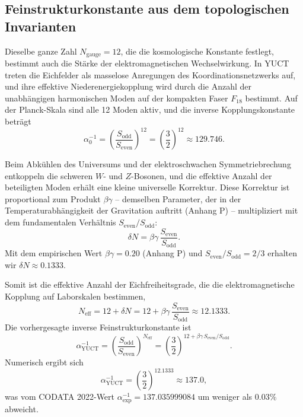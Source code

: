 \documentclass[12pt,a4paper]{article}
\begin{document}
	\subsection{Feinstrukturkonstante aus dem topologischen Invarianten}
	
	Dieselbe ganze Zahl \(N_{\mathrm{gauge}} = 12\), die die kosmologische Konstante festlegt, bestimmt auch die Stärke der elektromagnetischen Wechselwirkung.  
	In YUCT treten die Eichfelder als masselose Anregungen des Koordinationsnetzwerks auf, und ihre effektive Niederenergiekopplung wird durch die Anzahl der unabhängigen harmonischen Moden auf der kompakten Faser \(F_{18}\) bestimmt.  
	Auf der Planck-Skala sind alle 12 Moden aktiv, und die inverse Kopplungskonstante beträgt
	\begin{equation}
		\alpha_0^{-1} = \left( \frac{S_{\mathrm{odd}}}{S_{\mathrm{even}}} \right)^{12}
		= \left( \frac{3}{2} \right)^{12} \approx 129.746 .
	\end{equation}
	
	Beim Abkühlen des Universums und der elektroschwachen Symmetriebrechung entkoppeln die schweren \(W\)- und \(Z\)-Bosonen, und die effektive Anzahl der beteiligten Moden erhält eine kleine universelle Korrektur.  
	Diese Korrektur ist proportional zum Produkt \(\beta\gamma\) – demselben Parameter, der in der Temperaturabhängigkeit der Gravitation auftritt (Anhang P) – multipliziert mit dem fundamentalen Verhältnis \(S_{\mathrm{even}}/S_{\mathrm{odd}}\):
	\begin{equation}
		\delta N = \beta\gamma \, \frac{S_{\mathrm{even}}}{S_{\mathrm{odd}}} .
		\label{eq:deltaN}
	\end{equation}
	Mit dem empirischen Wert \(\beta\gamma = 0.20\) (Anhang P) und \(S_{\mathrm{even}}/S_{\mathrm{odd}} = 2/3\) erhalten wir \(\delta N \approx 0.1333\).
	
	Somit ist die effektive Anzahl der Eichfreiheitsgrade, die die elektromagnetische Kopplung auf Laborskalen bestimmen,
	\begin{equation}
		N_{\mathrm{eff}} = 12 + \delta N = 12 + \beta\gamma\,\frac{S_{\mathrm{even}}}{S_{\mathrm{odd}}} \approx 12.1333 .
	\end{equation}
	Die vorhergesagte inverse Feinstrukturkonstante ist
	\begin{equation}
		\boxed{\alpha^{-1}_{\mathrm{YUCT}} = \left( \frac{S_{\mathrm{odd}}}{S_{\mathrm{even}}} \right)^{N_{\mathrm{eff}}}
			= \left( \frac{3}{2} \right)^{12 + \beta\gamma\,S_{\mathrm{even}}/S_{\mathrm{odd}}} } .
		\label{eq:alphaYUCT}
	\end{equation}
	Numerisch ergibt sich
	\[
	\alpha^{-1}_{\mathrm{YUCT}} = \left( \frac{3}{2} \right)^{12.1333} \approx 137.0 ,
	\]
	was vom CODATA 2022-Wert \(\alpha^{-1}_{\mathrm{exp}} = 137.035999084\) um weniger als \(0.03\%\) abweicht.
	
\end{document}
